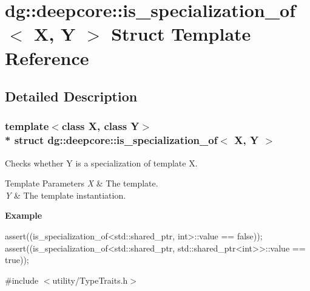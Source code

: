 \hypertarget{structdg_1_1deepcore_1_1is__specialization__of}{}\section{dg\+:\+:deepcore\+:\+:is\+\_\+specialization\+\_\+of$<$ X, Y $>$ Struct Template Reference}
\label{structdg_1_1deepcore_1_1is__specialization__of}


\subsection{Detailed Description}
\subsubsection*{template$<$class X, class Y$>$\\*
struct dg\+::deepcore\+::is\+\_\+specialization\+\_\+of$<$ X, Y $>$}

Checks whether {\ttfamily Y} is a specialization of template {\ttfamily X}. 


\begin{DoxyTemplParams}{Template Parameters}
{\em X} & The template. \\
\hline
{\em Y} & The template instantiation.\\
\hline
\end{DoxyTemplParams}
{\bfseries Example} 
\begin{DoxyCode}
assert((is\_specialization\_of<std::shared\_ptr, int>::value == \textcolor{keyword}{false}));
assert((is\_specialization\_of<std::shared\_ptr, std::shared\_ptr<int>>::value == \textcolor{keyword}{true}));
\end{DoxyCode}
 

{\ttfamily \#include $<$utility/\+Type\+Traits.\+h$>$}

